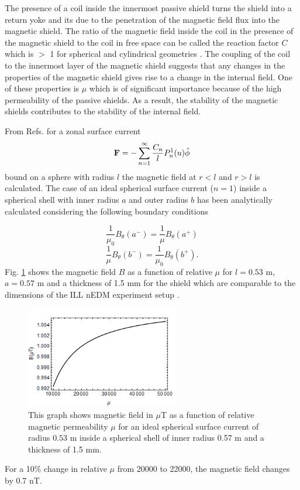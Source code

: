 \documentclass[review]{elsarticle}
\begin{document}
The presence of a coil inside the innermost passive shield turns the shield into a return yoke and its due to the penetration of the magnetic field flux into the magnetic shield. The ratio of the magnetic field inside the coil in the presence of the magnetic shield to the coil in free space can be called the reaction factor $C$ which is $>$ 1 for spherical and cylindrical geometries \cite{bib:bidinosti}. The coupling of the coil to the innermost layer of the magnetic shield suggests that any changes in the properties of the magnetic shield gives rise to a change in the internal field. One of these properties is $\mu$ which is of significant importance because of the high permeability of the passive shields. As a result, the stability of the magnetic shields contributes to the stability of the internal field.

From Refs. \cite{bib:smythe, bib:ferraro} for a zonal surface current
\begin{equation}
\bold{F}=- \sum_{n=1} ^{\infty} \frac{C_n}{l} P^1 _n (u) \hat{\phi}
\end{equation}
bound on a sphere with radius $l$ the magnetic field at $r < l$ and $r>l$ is calculated.
The case of an ideal spherical surface current ($n=1$) inside a spherical shell with inner radius $a$ and outer radius $b$ has been analytically calculated considering the following boundary conditions

\begin{equation}
\frac{1}{\mu_0} B_{\theta} (a^-) = \frac{1}{\mu} B_{\theta}(a^+)
\end{equation}
\begin{equation}
\frac{1}{\mu}B_{\theta}(b^-)=\frac{1}{\mu_0}B_{\theta}(b^+).
\end{equation}
Fig. \ref{fig:Magnetic_Field} shows the magnetic field $B$ as a function of relative $\mu$ for $l=0.53$ m, $a=0.57$ m and a thickness of 1.5 mm for the shield which are comparable to the dimensions of the ILL nEDM experiment setup \cite{bib:baker, bib:knecht}.
\begin{figure}[h!]
\begin{center}
   \includegraphics[width=0.6\textwidth]{B_vs_mu.PNG}
    \caption{This graph shows magnetic field in $\mu$T as a function of relative magnetic permeability $\mu$ for an ideal spherical surface current of radius $0.53$ m inside a spherical shell of inner radius 0.57 m and a thickness of 1.5 mm.}
    \label{fig:Magnetic_Field}
    \end{center}
\end{figure} 
For a 10\% change in relative $\mu$ from 20000 to 22000, the magnetic field changes by 0.7 nT.
\end{document}
